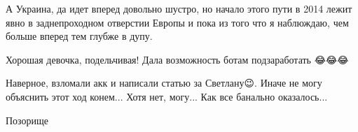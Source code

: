 \begin{itemize}
А Украина, да идет вперед довольно шустро, но начало этого пути в 2014 лежит
явно в заднепроходном отверстии Европы и пока из того что я наблюждаю, чем
больше вперед тем глубже в дупу.

 
Хорошая девочка, подельчивая! Дала возможность ботам подзаработать 😂😂😂

 
Наверное, взломали акк и написали статью за Светлану😉. Иначе не могу объяснить этот ход конем... Хотя нет, могу... Как все банально оказалось...

 
Позорище

\end{itemize}

